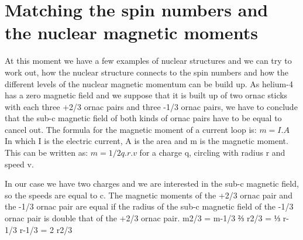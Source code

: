 \section{Matching the spin numbers and the nuclear magnetic moments}

At this moment we have a few examples of nuclear structures and we can try to work out, how the nuclear structure connects to the spin numbers and how the different levels of the nuclear magnetic momentum can be build up.
As helium-4 has a zero magnetic field and we suppose that it is built up of two ornac sticks with each three +2/3 ornac pairs and three -1/3 ornac pairs, we have to conclude that the sub-c magnetic field of both kinds of ornac pairs have to be equal to cancel out. The formula for the magnetic moment of a current loop is:
$m =  I.A$
In which I is the electric current, A is the area and m is the magnetic moment. This can be written as:
$m = 1/2 q.r.v$
for a charge q, circling with radius r and speed v.

In our case we have two charges and we are interested in the sub-c magnetic field, so the speeds are equal to c. The magnetic moments of the +2/3 ornac pair and the -1/3 ornac pair are equal if the radius of the sub-c magnetic field of the -1/3 ornac pair is double that of the +2/3 ornac pair.
m2/3 = m-1/3
⅔ r2/3 = ⅓ r-1/3
r-1/3 = 2 r2/3

